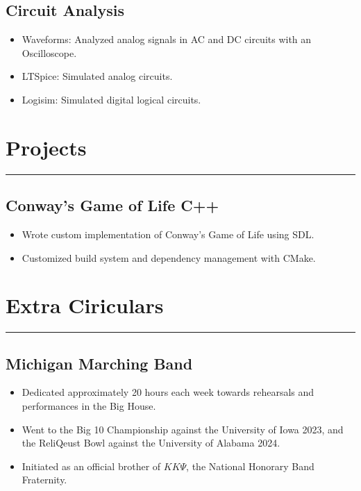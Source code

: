 \documentclass[10pt, letterpaper]{article}
\begin{document}
\subsection*{Circuit Analysis}
\begin{itemize}[noitemsep]
	\item Waveforms: Analyzed analog signals in AC and DC circuits with an Oscilloscope.	
	\item LTSpice: Simulated analog circuits.
	\item Logisim: Simulated digital logical circuits.
\end{itemize}

\section*{Projects}
\hrule
\vspace{7pt}

\subsection*{Conway's Game of Life \text{\text{|}} C++}
\begin{itemize}[noitemsep]
	\item Wrote custom implementation of Conway's Game of Life using SDL.
	\item Customized build system and dependency management with CMake.
\end{itemize}

\section*{Extra Ciriculars}
\hrule
\vspace{7pt}

\subsection*{Michigan Marching Band}
\begin{itemize}[noitemsep]
	\item Dedicated approximately 20 hours each week towards rehearsals and performances in the Big House.
	\item Went to the Big 10 Championship against the University of Iowa 2023,
		and the ReliQeust Bowl against the University of Alabama 2024.
	\item Initiated as an official brother of $K K\Psi$, the National Honorary Band Fraternity.
\end{itemize}
\end{document}
